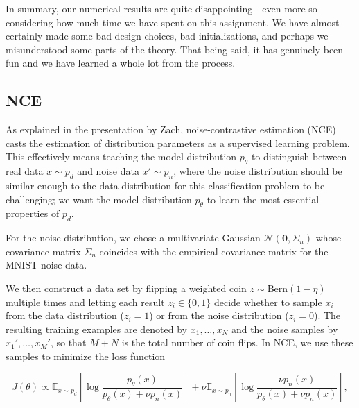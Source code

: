 \documentclass[a4paper]{article}
\theoremstyle{definition}
\theoremstyle{plain}
\begin{document}
In summary, our numerical results are quite disappointing - even more so considering how much time we have spent on this assignment. We have almost certainly made some bad design choices, bad initializations, and perhaps we misunderstood some parts of the theory. That being said, it has genuinely been fun and we have learned a whole lot from the process. 


\subsection*{NCE}

As explained in the presentation by Zach, noise-contrastive estimation (NCE) casts the estimation of distribution parameters as a supervised learning problem. This effectively means teaching the model distribution $p_\theta$ to distinguish between real data $x \sim p_d$ and noise data $x' \sim p_n$, where the noise distribution should be similar enough to the data distribution for this classification problem to be challenging; we want the model distribution $p_\theta$ to learn  the most essential properties of $p_d$.

For the noise distribution, we chose a multivariate Gaussian $\mathcal{N}(\mathbf{0},\Sigma_n)$ whose covariance matrix $\Sigma_n$ coincides with the empirical covariance matrix for the MNIST noise data.

We then construct a data set by flipping a weighted coin $z \sim \text{Bern}(1-\eta)$ multiple times and letting each result $z_i \in \{0,1\}$ decide whether to sample $x_i$ from the data distribution ($z_i = 1$) or from the noise distribution ($z_i = 0$). The resulting training examples are denoted by $x_1,\ldots,x_N$ and the noise samples by $x_1',\ldots,x_M'$, so that $M+N$ is the total number of coin flips. In NCE, we use these samples to minimize the loss function

\begin{equation}\label{J_function}
J(\theta) \propto \mathbb{E}_{x \sim p_d} \left[ \log \frac{p_\theta(x)}{p_\theta(x) + \nu p_n(x)}\right] + \nu \mathbb{E}_{x \sim p_n} \left[ \log \frac{ \nu p_n(x)}{p_\theta(x) + \nu p_n(x)}\right],
\end{equation}
\end{document}
